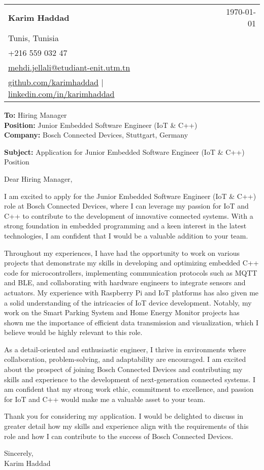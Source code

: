 \documentclass[letterpaper,11pt]{article}
\makeatletter
\newcommand{\letterHeading}[5]{
    \begin{tabular*}{\textwidth}{l@{\extracolsep{\fill}}r}
    \textbf{\Large #1} & #5 \\  %
    #2 & \\
    #3 & \\
    #4 & \\
    \end{tabular*}
    \vspace{15pt}
}
\newcommand{\letterRecipient}[3]{
    \textbf{\large To:} #1 \\
    \textbf{\large Position:} #2 \\
    \textbf{\large Company:} #3 \\
    \vspace{12pt}
}
\newcommand{\letterSubject}[1]{
    \textbf{\large Subject:} #1 \\
    \vspace{15pt}
}
\makeatother
\begin{document}
    \letterHeading
    {Karim Haddad}
    {Tunis, Tunisia}
    {+216 559 032 47 \\ \href{mailto:mehdi.jellali@etudiant-enit.utm.tn}{mehdi.jellali@etudiant-enit.utm.tn}}
    {\href{https://github.com/karimhaddad}{github.com/karimhaddad} $|$ \href{https://www.linkedin.com/in/karimhaddad}{linkedin.com/in/karimhaddad}}
    {\today}

    \letterRecipient
    {Hiring Manager}
    {Junior Embedded Software Engineer (IoT & C++)}
    {Bosch Connected Devices, Stuttgart, Germany}

    \letterSubject{Application for Junior Embedded Software Engineer (IoT & C++) Position}

    Dear Hiring Manager,

    I am excited to apply for the Junior Embedded Software Engineer (IoT & C++) role at Bosch Connected Devices, where I can leverage my passion for IoT and C++ to contribute to the development of innovative connected systems. With a strong foundation in embedded programming and a keen interest in the latest technologies, I am confident that I would be a valuable addition to your team.

    Throughout my experiences, I have had the opportunity to work on various projects that demonstrate my skills in developing and optimizing embedded C++ code for microcontrollers, implementing communication protocols such as MQTT and BLE, and collaborating with hardware engineers to integrate sensors and actuators. My experience with Raspberry Pi and IoT platforms has also given me a solid understanding of the intricacies of IoT device development. Notably, my work on the Smart Parking System and Home Energy Monitor projects has shown me the importance of efficient data transmission and visualization, which I believe would be highly relevant to this role.

    As a detail-oriented and enthusiastic engineer, I thrive in environments where collaboration, problem-solving, and adaptability are encouraged. I am excited about the prospect of joining Bosch Connected Devices and contributing my skills and experience to the development of next-generation connected systems. I am confident that my strong work ethic, commitment to excellence, and passion for IoT and C++ would make me a valuable asset to your team.

    Thank you for considering my application. I would be delighted to discuss in greater detail how my skills and experience align with the requirements of this role and how I can contribute to the success of Bosch Connected Devices.

    Sincerely,\\[12pt]

    Karim Haddad
\end{document}
